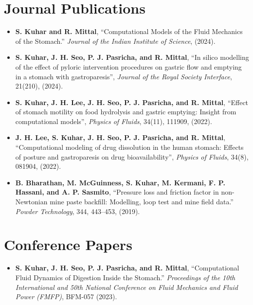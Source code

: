 \documentclass[11pt]{article}
\begin{document}
\vspace{6mm}

\section*{Journal Publications}

\begin{itemize}[leftmargin=*,itemsep=1pt]
    \item \textbf{S. Kuhar and R. Mittal}, “Computational Models of the Fluid Mechanics of the Stomach.” \textit{Journal of the Indian Institute of Science}, (2024).
    \item \textbf{S. Kuhar, J. H. Seo, P. J. Pasricha, and R. Mittal}, “In silico modelling of the effect of pyloric intervention procedures on gastric flow and emptying in a stomach with gastroparesis”, \textit{Journal of the Royal Society Interface}, 21(210), (2024).
    \item \textbf{S. Kuhar, J. H. Lee, J. H. Seo, P. J. Pasricha, and R. Mittal}, “Effect of stomach motility on food hydrolysis and gastric emptying: Insight from computational models”, \textit{Physics of Fluids}, 34(11), 111909, (2022).
    \item \textbf{J. H. Lee, S. Kuhar, J. H. Seo, P. J. Pasricha, and R. Mittal}, “Computational modeling of drug dissolution in the human stomach: Effects of posture and gastroparesis on drug bioavailability”, \textit{Physics of Fluids}, 34(8), 081904, (2022).
    \item \textbf{B. Bharathan, M. McGuinness, S. Kuhar, M. Kermani, F. P. Hassani, and A. P. Sasmito}, “Pressure loss and friction factor in non-Newtonian mine paste backfill: Modelling, loop test and mine field data.” \textit{Powder Technology}, 344, 443–453, (2019).
\end{itemize}

\vspace{6mm}

\section*{Conference Papers}

\begin{itemize}[leftmargin=*,itemsep=1pt]
    \item \textbf{S. Kuhar, J. H. Seo, P. J. Pasricha, and R. Mittal}, “Computational Fluid Dynamics of Digestion Inside the Stomach.” \textit{Proceedings of the 10th International and 50th National Conference on Fluid Mechanics and Fluid Power (FMFP)}, BFM-057 (2023).
\end{itemize}
\end{document}
